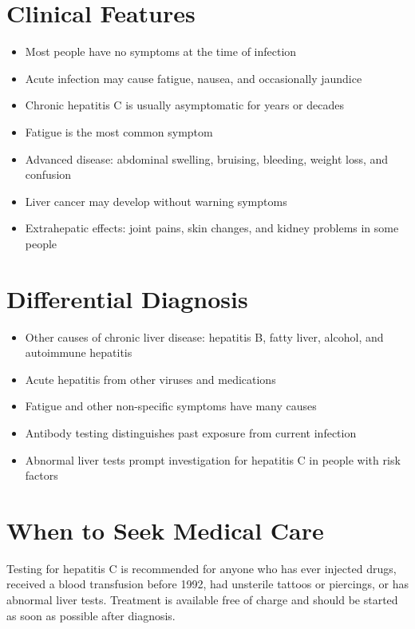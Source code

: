 \section*{Clinical Features}
\begin{itemize}
    \item Most people have no symptoms at the time of infection
    \item Acute infection may cause fatigue, nausea, and occasionally jaundice
    \item Chronic hepatitis C is usually asymptomatic for years or decades
    \item Fatigue is the most common symptom
    \item Advanced disease: abdominal swelling, bruising, bleeding, weight loss, and confusion
    \item Liver cancer may develop without warning symptoms
    \item Extrahepatic effects: joint pains, skin changes, and kidney problems in some people
\end{itemize}

\section*{Differential Diagnosis}
\begin{itemize}
    \item Other causes of chronic liver disease: hepatitis B, fatty liver, alcohol, and autoimmune hepatitis
    \item Acute hepatitis from other viruses and medications
    \item Fatigue and other non-specific symptoms have many causes
    \item Antibody testing distinguishes past exposure from current infection
    \item Abnormal liver tests prompt investigation for hepatitis C in people with risk factors
\end{itemize}

\section*{When to Seek Medical Care}
Testing for hepatitis C is recommended for anyone who has ever injected drugs, received a blood transfusion before 1992, had unsterile tattoos or piercings, or has abnormal liver tests. Treatment is available free of charge and should be started as soon as possible after diagnosis.


